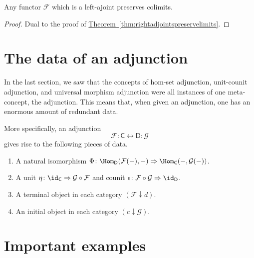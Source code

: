 \documentclass[notes.tex]{subfiles}
\begin{document}
\begin{corollary}
  \label{cor:leftadjointspreservecolimits}
  Any functor $\mathcal{F}$ which is a left-ajoint preserves colimits.
\end{corollary}
\begin{proof}
  Dual to the proof of \hyperref[thm:rightadjointspreservelimits]{Theorem~\ref*{thm:rightadjointspreservelimits}}.
\end{proof}

\section{The data of an adjunction}
\label{sec:the_data_of_an_adjunction}

In the last section, we saw that the concepts of hom-set adjunction, unit-counit adjunction, and universal morphism adjunction were all instances of one meta-concept, the adjunction. This means that, when given an adjunction, one has an enormous amount of redundant data.

More specifically, an adjunction
\begin{equation*}
  \mathcal{F} : \mathsf{C} \leftrightarrow \mathsf{D} : \mathcal{G}
\end{equation*}
gives rise to the following pieces of data.
\begin{enumerate}
  \item A natural isomorphism $\Phi\colon \Hom_{\mathsf{D}}(\mathcal{F}(-), -) \Rightarrow \Hom_{\mathsf{C}}(-, \mathcal{G}(-))$.

  \item A unit $\eta\colon \id_{\mathsf{C}} \Rightarrow \mathcal{G} \circ \mathcal{F}$ and counit $\epsilon\colon \mathcal{F} \circ \mathcal{G} \Rightarrow \id_{\mathsf{D}}$.

  \item A terminal object in each category $(\mathcal{F} \downarrow d)$.

  \item An initial object in each category $(c \downarrow \mathcal{G})$.
\end{enumerate}


\section{Important examples}
\label{sec:important_examples}
\end{document}
